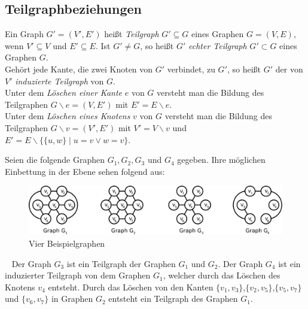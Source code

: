 \subsection{Teilgraphbeziehungen}
Ein Graph $G'=(V',E')$ heißt \emph{Teilgraph} $G'\subseteq G$ eines Graphen $G=(V,E)$, wenn $V'\subseteq V$ und $E'\subseteq E$. Ist $G' \neq G$, so heißt $G'$ \emph{echter Teilgraph} $G'\subset G$ eines Graphen $G$.\\Gehört jede Kante, die zwei Knoten von $G'$ verbindet, zu $G'$, so heißt $G'$ der von $V'$ \emph{induzierte Teilgraph} von $G$.\\Unter dem \emph{Löschen einer Kante} $e$ von $G$ versteht man die Bildung des Teilgraphen $G \backslash e = (V, E')$ mit $E'=E  \backslash e$.\\Unter dem \emph{Löschen eines Knotens} $v$ von $G$ versteht man die Bildung des Teilgraphen $G \backslash v = (V', E')$ mit $V'=V  \backslash v$ und $E'=E \backslash \{\{u, w\}\;|\; u=v \vee w = v\}$.
\begin{bsp}
Seien die folgende Graphen $G_1,G_2,G_3$ und $G_4$ gegeben. Ihre möglichen Einbettung in der Ebene sehen folgend aus:
\begin{figure}[h!]
		\centering 		 
   \includegraphics[width=430pt]{bilder/bsp2.pdf}
	\caption{Vier Beispielgraphen}
  	 \end{figure}
  	 ~\newline  	 
Der Graph $G_3$ ist ein Teilgraph der Graphen $G_1$ und $G_2$. Der Graph $G_4$ ist ein induzierter Teilgraph von dem Graphen $G_1$, welcher durch das Löschen des Knotens $v_4$ entsteht. Durch das Löschen von den Kanten $\{v_1,v_3\}$,$\{v_2,v_5\}$,$\{v_5,v_7\}$ und $\{v_6,v_7\}$ in Graphen $G_2$ entsteht ein Teilgraph des Graphen $G_1$.
\end{bsp}
